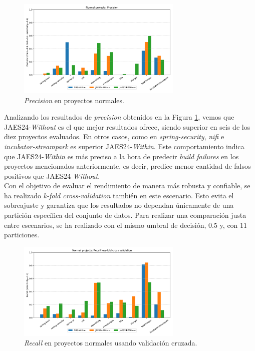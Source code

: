 \begin{figure}
    \centering
    \includegraphics[width=0.7\textwidth]{images/Normal projects: Precision.pdf}
    \caption{\textit{Precision} en proyectos normales.}
    \label{fig:train_test_precision_normal_projects}
\end{figure}

Analizando los resultados de \textit{precision} obtenidos en la Figura
\ref{fig:train_test_precision_normal_projects}, vemos que JAES24-\textit{Without} es el que mejor
resultados ofrece, siendo superior en seis de los diez proyectos evaluados. En otros casos, como
en \textit{spring-security}, \textit{nifi} e \textit{incubator-streampark} es superior 
JAES24-\textit{Within}. Este comportamiento indica que JAES24-\textit{Within} es más preciso
a la hora de predecir \textit{build failures} en los proyectos mencionados anteriormente, es decir, 
predice menor cantidad de falsos positivos que JAES24-\textit{Without}.\\

Con el objetivo de evaluar el rendimiento de manera más robusta y confiable, se ha realizado
\textit{k-fold cross-validation} también en este escenario. Esto evita el sobreajuste y
garantiza que los resultados no dependan únicamente de una partición específica del conjunto
de datos. Para realizar una comparación justa entre escenarios, se ha realizado con el mismo
umbral de decisión, $0.5$ y, con $11$ particiones.

\begin{figure}[H]
    \centering
    \includegraphics[width=0.7\textwidth]{images/Normal projects: Recall key-fold cross validation.pdf}
    \caption{\textit{Recall} en proyectos normales usando validación cruzada.}
    \label{fig:key-fold_recall_normal_projects}
\end{figure}


